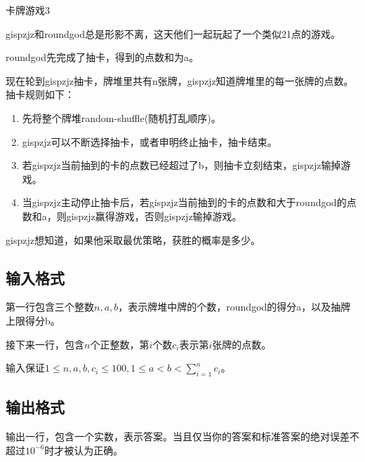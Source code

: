 \begin{Problem}{卡牌游戏}{3}

gispzjz和roundgod总是形影不离，这天他们一起玩起了一个类似21点的游戏。

roundgod先完成了抽卡，得到的点数和为a。

现在轮到gispzjz抽卡，牌堆里共有n张牌，gispzjz知道牌堆里的每一张牌的点数。抽卡规则如下：

\begin{enumerate}
\item 先将整个牌堆random-shuffle(随机打乱顺序)。
\item gispzjz可以不断选择抽卡，或者申明终止抽卡，抽卡结束。
\item 若gispzjz当前抽到的卡的点数已经超过了b，则抽卡立刻结束，gispzjz输掉游戏。
\item 当gispzjz主动停止抽卡后，若gispzjz当前抽到的卡的点数和大于roundgod的点数和a，则gispzjz赢得游戏，否则gispzjz输掉游戏。
\end{enumerate}

gispzjz想知道，如果他采取最优策略，获胜的概率是多少。

\subsection*{输入格式}

第一行包含三个整数$n,a,b$，表示牌堆中牌的个数，roundgod的得分a，以及抽牌上限得分b。

接下来一行，包含$n$个正整数，第$i$个数$c_i$表示第$i$张牌的点数。

输入保证$1 \leq n,a,b,c_i \leq 100, 1 \leq a < b < \sum_{i=1}^n c_i$。

\subsection*{输出格式}

输出一行，包含一个实数，表示答案。当且仅当你的答案和标准答案的绝对误差不超过$10^{-6}$时才被认为正确。


\end{Problem}
